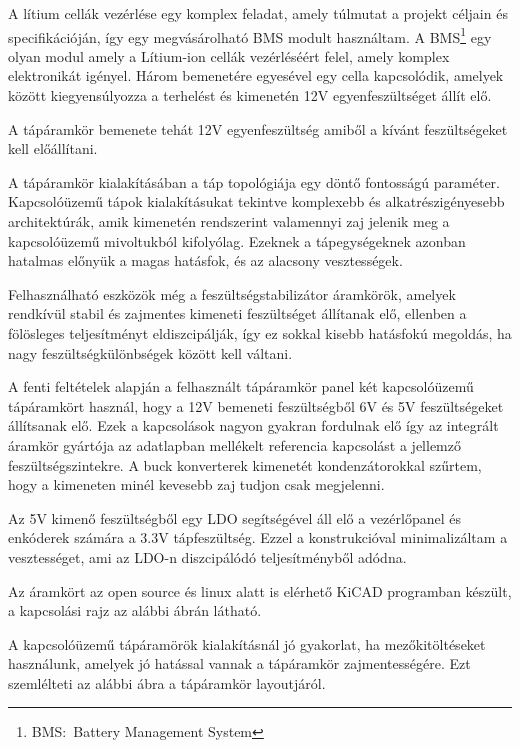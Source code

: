 \medskip

A lítium cellák vezérlése egy komplex feladat, amely túlmutat a projekt céljain
és specifikációján, így egy megvásárolható BMS modult használtam. A
BMS\footnote{BMS:~Battery Management System} egy olyan modul amely a Lítium-ion
cellák vezérléséért felel, amely komplex elektronikát igényel. Három bemenetére
egyesével egy cella kapcsolódik, amelyek között kiegyensúlyozza a terhelést és
kimenetén 12V egyenfeszültséget állít elő.

A tápáramkör bemenete tehát 12V egyenfeszültség amiből a kívánt feszültségeket
kell előállítani. 


A tápáramkör kialakításában a táp topológiája egy döntő fontosságú paraméter.
Kapcsolóüzemű tápok kialakításukat tekintve komplexebb és alkatrészigényesebb
architektúrák, amik kimenetén rendszerint valamennyi zaj jelenik meg a
kapcsolóüzemű mivoltukból kifolyólag. Ezeknek a tápegységeknek azonban hatalmas
előnyük a magas hatásfok, és az alacsony vesztességek.

Felhasználható eszközök még a feszültségstabilizátor áramkörök, amelyek rendkívül
stabil és zajmentes kimeneti feszültséget állítanak elő, ellenben a fölösleges
teljesítményt eldiszcipálják, így ez sokkal kisebb hatásfokú megoldás, ha nagy
feszültségkülönbségek között kell váltani.

A fenti feltételek alapján a felhasznált tápáramkör panel két kapcsolóüzemű
tápáramkört használ, hogy a 12V bemeneti feszültségből 6V és 5V feszültségeket
állítsanak elő. Ezek a kapcsolások nagyon gyakran fordulnak elő így az integrált
áramkör gyártója az adatlapban mellékelt referencia kapcsolást a jellemző
feszültségszintekre. A buck konverterek kimenetét kondenzátorokkal szűrtem, hogy
a kimeneten minél kevesebb zaj tudjon csak megjelenni.

Az 5V kimenő feszültségből egy LDO segítségével áll elő a vezérlőpanel és
enkóderek számára a 3.3V tápfeszültség. Ezzel a konstrukcióval minimalizáltam
a vesztességet, ami az LDO-n diszcipálódó teljesítményből adódna. 

Az áramkört az open source és linux alatt is elérhető KiCAD programban
készült, a kapcsolási rajz az alábbi ábrán látható.


A kapcsolóüzemű tápáramörök kialakításnál jó gyakorlat, ha mezőkitöltéseket
használunk, amelyek jó hatással vannak a tápáramkör zajmentességére. Ezt
szemlélteti az alábbi ábra a tápáramkör layoutjáról.

